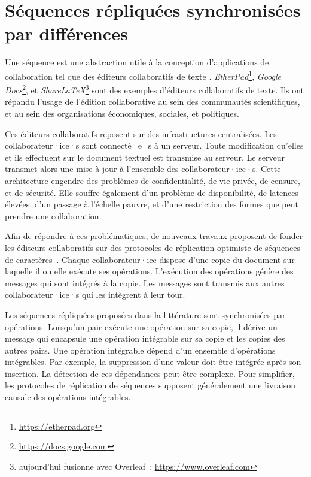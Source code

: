 
\chapter{Séquences répliquées synchronisées par différences}\label{ch:dotted-logootsplit}

\minitoc{}
\bigskip

Une séquence est une abstraction utile à la conception d'applications de collaboration tel que des éditeurs collaboratifs de texte \autocite{2017_nicolas-mute-demo,nedelec2016_crate}.
\emph{EtherPad}\footnote{\url{https://etherpad.org}}, \emph{Google Docs}\footnote{\url{https://docs.google.com}}, et \emph{ShareLaTeX}\footnote{aujourd'hui fusionne avec Overleaf~: \url{https://www.overleaf.com}} sont des exemples d'éditeurs collaboratifs de texte.
Ils ont répandu l'usage de l'édition collaborative au sein des communautés scientifiques, et au sein des organisations économiques, sociales, et politiques.

Ces éditeurs collaboratifs reposent sur des infrastructures centralisées.
Les collaborateur·ice·s sont connecté·e·s à un serveur.
Toute modification qu'elles et ils effectuent sur le document textuel est transmise au serveur.
Le serveur transmet alors une mise-à-jour à l'ensemble des collaborateur·ice·s.
Cette architecture engendre des problèmes de confidentialité, de vie privée, de censure, et de sécurité.
Elle souffre également d'un problème de disponibilité, de latences élevées, d'un passage à l'échelle pauvre,
et d'une restriction des formes que peut prendre une collaboration.

Afin de répondre à ces problématiques, de nouveaux travaux proposent de fonder les éditeurs collaboratifs sur des protocoles de réplication optimiste de séquences de caractères~\autocite{oster_2006_woot,weiss_2009_logoot,preguica_2009_treedoc,roh_2011_rga}.
Chaque collaborateur·ice dispose d'une copie du document sur-laquelle il ou elle exécute ses opérations.
L'exécution des opérations génère des messages qui sont intégrés à la copie.
Les messages sont transmis aux autres collaborateur·ice·s qui les intègrent à leur tour.

Les séquences répliquées proposées dans la littérature sont synchronisées par opérations.
Lorsqu'un pair exécute une opération sur sa copie, il dérive un message qui encapsule une opération intégrable sur sa copie et les copies des autres pairs.
Une opération intégrable dépend d'un ensemble d'opérations intégrables.
Par exemple, la suppression d'une valeur doit être intégrée après son insertion.
La détection de ces dépendances peut être complexe.
Pour simplifier, les protocoles de réplication de séquences supposent généralement une livraison causale des opérations intégrables.

